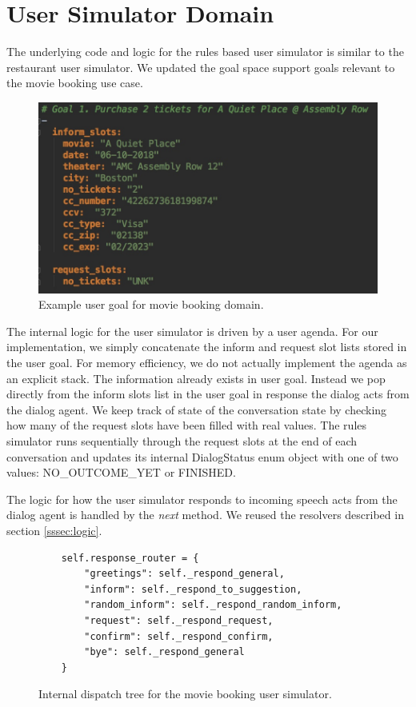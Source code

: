 \section{User Simulator Domain}

The underlying code and logic for the rules based user simulator is similar to the restaurant user simulator. We updated the goal space support goals relevant to the movie booking use case.

\begin{figure}[h!]
	\centering
	\includegraphics[scale=.25]{diagrams/sample_movie_goal.jpeg}
	\caption{ Example user goal for movie booking domain.}
	\label{fig:movie_goal}
\end{figure}

The  internal logic for the user simulator is driven by a user agenda. For our implementation, we simply concatenate the inform and request slot lists stored in the user goal. For memory efficiency, we do not actually implement the agenda as an explicit stack. The information already exists in user goal. Instead we pop directly from the inform slots list in the user goal in response the dialog acts from the dialog agent. We keep track of state of the conversation state by checking how many of the request slots have been filled with real values. The rules simulator runs sequentially through the request slots at the end of each conversation and updates its internal DialogStatus enum object with one of two values: NO\_OUTCOME\_YET or FINISHED.

The logic for how the user simulator responds to incoming speech acts from the dialog agent is handled by the \textit{next} method. We reused the resolvers described in section \ref{sssec:logic}.

\begin{figure}[h!]
	\label{fig:movie_dispatch_tree}
	\begin{lstlisting}
 	self.response_router = {
 		"greetings": self._respond_general,
		"inform": self._respond_to_suggestion,
		"random_inform": self._respond_random_inform,
		"request": self._respond_request,
		"confirm": self._respond_confirm,
		"bye": self._respond_general
	}
	\end{lstlisting}
	\caption{ Internal dispatch tree for the movie booking user simulator.}
\end{figure}

